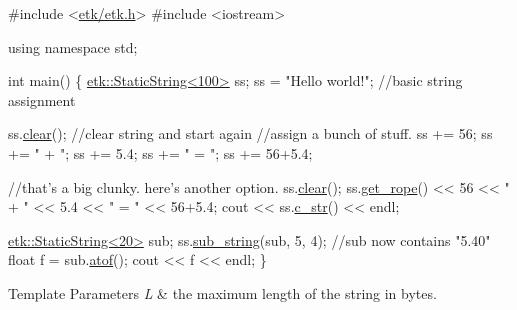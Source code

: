 \begin{DoxyCode}
\textcolor{preprocessor}{ #include <\hyperlink{etk_8h}{etk/etk.h}>}
\textcolor{preprocessor}{#include <iostream>}

\textcolor{keyword}{using namespace }std;


\textcolor{keywordtype}{int} main()
\{
    \hyperlink{classetk_1_1_static_string}{etk::StaticString<100>} ss;
    ss = \textcolor{stringliteral}{"Hello world!"}; \textcolor{comment}{//basic string assignment}
    
    ss.\hyperlink{classetk_1_1_static_string_a5ddc4131a3eb881f56860cd563d1e537}{clear}(); \textcolor{comment}{//clear string and start again}
    \textcolor{comment}{//assign a bunch of stuff.}
    ss += 56;
    ss += \textcolor{stringliteral}{" + "};
    ss += 5.4;
    ss += \textcolor{stringliteral}{" = "};
    ss += 56+5.4;
    
    \textcolor{comment}{//that's a big clunky. here's another option.}
    ss.\hyperlink{classetk_1_1_static_string_a5ddc4131a3eb881f56860cd563d1e537}{clear}();
    ss.\hyperlink{classetk_1_1_static_string_a154223efd5135ba6ea4e553494d88753}{get\_rope}() << 56 << \textcolor{stringliteral}{" + "} << 5.4  << \textcolor{stringliteral}{" = "} << 56+5.4;
    cout << ss.\hyperlink{classetk_1_1_static_string_aa775f517938685482baa772fb6cb1734}{c\_str}() << endl;
    
    \hyperlink{classetk_1_1_static_string}{etk::StaticString<20>} sub;
    ss.\hyperlink{classetk_1_1_static_string_a003d54ec39d1a35ef5b1c3ba7c88dee2}{sub\_string}(sub, 5, 4);
    \textcolor{comment}{//sub now contains "5.40"}
    \textcolor{keywordtype}{float} f = sub.\hyperlink{classetk_1_1_static_string_a97a8dd70c2cc5a59a38315a36e315cb9}{atof}();
    cout << f << endl;
\}
\end{DoxyCode}
 
\begin{DoxyTemplParams}{Template Parameters}
{\em L} & the maximum length of the string in bytes. \\
\hline
\end{DoxyTemplParams}


